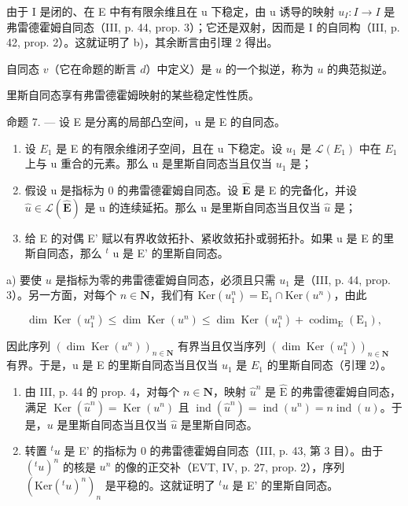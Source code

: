 由于 I 是闭的、在 E 中有有限余维且在 u 下稳定，由 u 诱导的映射 \(u_{I}\colon I \to I\) 是弗雷德霍姆自同态（III, p. 44, prop. 3）；它还是双射，因而是 I 的自同构（III, p. 42, prop. 2）。这就证明了 b)，其余断言由引理 2 得出。

自同态 \(v\)（它在命题的断言 \(d\)）中定义）是 \(u\) 的一个拟逆，称为 \(u\) 的典范拟逆。

里斯自同态享有弗雷德霍姆映射的某些稳定性性质。

命题 7. — 设 E 是分离的局部凸空间，u 是 E 的自同态。

\begin{enumerate}
\def\labelenumi{\alph{enumi})}
\item
   设 \(E_{1}\) 是 E 的有限余维闭子空间，且在 u 下稳定。设 \(u_{1}\) 是 \(\mathcal{L}(E_{1})\) 中在 \(E_{1}\) 上与 u 重合的元素。那么 u 是里斯自同态当且仅当 \(u_{1}\) 是；
\item
   假设 u 是指标为 0 的弗雷德霍姆自同态。设 \(\widehat{\mathbf{E}}\) 是 E 的完备化，并设 \(\widehat{u} \in \mathcal{L}(\widehat{\mathbf{E}})\) 是 u 的连续延拓。那么 u 是里斯自同态当且仅当 \(\widehat{u}\) 是；
\item
 给 E 的对偶 E' 赋以有界收敛拓扑、紧收敛拓扑或弱拓扑。如果 u 是 E 的里斯自同态，那么 \(^{t}\) u 是 E' 的里斯自同态。
\end{enumerate}
a) 要使 \(u\) 是指标为零的弗雷德霍姆自同态，必须且只需 \(u_1\) 是（III, p. 44, prop. 3）。另一方面，对每个 \(n \in \mathbf{N}\)，我们有 \(\mathrm{Ker}(u_1^n) = \mathrm{E}_1 \cap \mathrm{Ker}(u^n)\)，由此


\[
\dim \operatorname{Ker} (u _ {1} ^ {n}) \leqslant \dim \operatorname{Ker} (u ^ {n}) \leqslant \dim \operatorname{Ker} (u _ {1} ^ {n}) + \operatorname{codim} _ {\mathrm{E}} (\mathrm{E} _ {1}),
\]

因此序列 \((\dim\operatorname{Ker}(u^{n}))_{n\in\mathbf{N}}\) 有界当且仅当序列 \((\dim\operatorname{Ker}(u_{1}^{n}))_{n\in\mathbf{N}}\) 有界。于是，u 是 E 的里斯自同态当且仅当 \(u_{1}\) 是 \(E_{1}\) 的里斯自同态（引理 2）。

\begin{enumerate}
\def\labelenumi{\alph{enumi})}
\setcounter{enumi}{1}
\item
  由 III, p. 44 的 prop. 4，对每个 \(n \in \mathbf{N}\)，映射 \(\widehat{u}^n\) 是 \(\widehat{\mathrm{E}}\) 的弗雷德霍姆自同态，满足 \(\operatorname{Ker}(\widehat{u}^n) = \operatorname{Ker}(u^n)\) 且 \(\operatorname{ind}(\widehat{u}^n) = \operatorname{ind}(u^n) = n\operatorname{ind}(u)\)。于是，\(u\) 是里斯自同态当且仅当 \(\widehat{u}\) 是里斯自同态。
\item
  转置 \({}^{t}u\) 是 E' 的指标为 0 的弗雷德霍姆自同态（III, p. 43, 第 3 目）。由于 \((^{t}u)^{n}\) 的核是 \(u^{n}\) 的像的正交补（EVT, IV, p. 27, prop. 2），序列 \((\mathrm{Ker}({}^{t}u)^{n})_{n}\) 是平稳的。这就证明了 \({}^{t}u\) 是 E' 的里斯自同态。
\end{enumerate}


